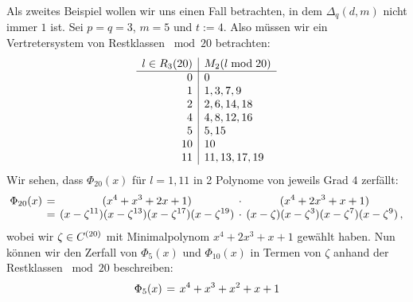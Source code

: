 
\begin{beispiel}
  Als zweites Beispiel wollen wir uns einen Fall betrachten, 
  in dem $\Delta_q(d,m)$ nicht immer $1$ ist.
  Sei $p=q=3$, $m=5$ und $t:= 4$.
  Also müssen wir ein Vertretersystem von Restklassen ${}\bmod 20$ betrachten:
  \[\begin{array}[t]{r|l}
    l \in R_3(20) & M_2(l \bmod 20) \\\hline
    0 & 0 \\
    1 & 1, 3, 7, 9 \\
    2 & 2, 6, 14, 18 \\
    4 & 4, 8, 12, 16 \\
    5 & 5, 15 \\
    10& 10 \\
    11& 11, 13, 17, 19 
    \end{array}\]
  Wir sehen, dass $\Phi_{20}(x)$ für $l=1,11$ in 
  2 Polynome von jeweils Grad $4$ zerfällt:
  \[\setlength{\arraycolsep}{2pt}\everymath{\displaystyle}
    \begin{array}{rcccc} 
      \Phi_{20}(x) &=& 
        (x^{4} + x^{3} + 2 x + 1) &\cdot& (x^{4} + 2 x^{3} + x + 1) \\
      &=& (x-\zeta^{11})(x-\zeta^{13})(x-\zeta^{17})(x-\zeta^{19}) &\cdot&
        (x-\zeta)(x-\zeta^{3})(x-\zeta^{7})(x-\zeta^{9})\,,
    \end{array}\]
  wobei wir $\zeta \in C^{(20)}$ mit Minimalpolynom $x^4+2x^3+x+1$ gewählt
  haben.
  Nun können wir den Zerfall von $\Phi_5(x)$ und $\Phi_{10}(x)$ in Termen von
  $\zeta$ anhand der Restklassen ${}\bmod{20}$ beschreiben:
  \[\setlength{\arraycolsep}{2pt}\everymath{\displaystyle}
    \begin{array}{rcccc} 
      \Phi_5(x)&=& x^4 + x^3 + x^2 + x + 1\\

\end{array}\]
\end{beispiel}
